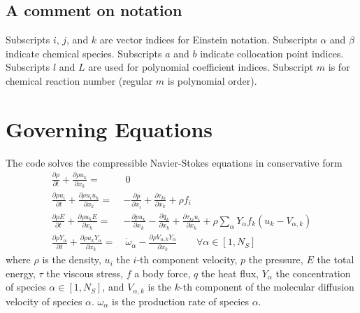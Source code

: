 \documentclass[notitlepage]{revtex4-1}
\begin{document}
\subsection{A comment on notation}

Subscripts $i$, $j$, and $k$ are vector indices for Einstein notation.
Subscripts $\alpha$ and $\beta$ indicate chemical species.
Subscripts $a$ and $b$ indicate collocation point indices.
Subscripts $l$ and $L$ are used for polynomial coefficient indices.
Subscript $m$ is for chemical reaction number (regular $m$ is polynomial order).

\section{Governing Equations}\label{ge}

The code solves the compressible Navier-Stokes equations in conservative form
\begin{subequations}\begin{align}
\frac{\partial\rho}{\partial{t}}+\frac{\partial\rho{u}_{k}}{\partial{x}_{k}}=&~0\label{eq:mass}\\
\frac{\partial\rho{u}_{i}}{\partial{t}}+\frac{\partial\rho{u}_{i}u_{k}}{\partial{x}_{k}}=&-\frac{\partial{p}}{\partial{x}_{i}}+\frac{\partial\tau_{ki}}{\partial{x}_{k}}+\rho{f}_{i}\label{eq:mom}\\
\frac{\partial\rho{E}}{\partial{t}}+\frac{\partial\rho{u}_{k}E}{\partial{x}_{k}}=&-\frac{\partial{p}u_{k}}{\partial{x}_{k}}-\frac{\partial{q}_{k}}{\partial{x}_{k}}+\frac{\partial\tau_{ki}u_{i}}{\partial{x}_{k}}+\rho\displaystyle\sum_{\alpha}Y_{\alpha}f_{k}\left({u}_{k}-V_{\alpha,k}\right)\label{eq:en}\\
\frac{\partial\rho{Y}_{\alpha}}{\partial{t}}+\frac{\partial\rho{u}_{k}Y_{\alpha}}{\partial{x}_{k}}=&~\dot\omega_{\alpha}-\frac{\partial\rho{V}_{\alpha,k}Y_{\alpha}}{\partial{x}_{k}}\qquad\forall\alpha\in\left[1,N_{S}\right]\label{eq:Y}
\end{align}
\end{subequations}
where $\rho$ is the density, ${u}_{i}$ the $i$-th component velocity, $p$ the pressure, $E$ the total energy, $\tau$ the viscous stress, $f$ a body force, $q$ the heat flux, $Y_{\alpha}$ the concentration of species $\alpha\in\left[1,N_{S}\right]$, and $V_{\alpha,k}$ is the $k$-th component of the molecular diffusion velocity of species $\alpha$. $\dot\omega_{\alpha}$ is the production rate of species $\alpha$.
\end{document}
